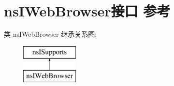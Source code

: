 \hypertarget{interfacens_i_web_browser}{}\section{ns\+I\+Web\+Browser接口 参考}
\label{interfacens_i_web_browser}
类 ns\+I\+Web\+Browser 继承关系图\+:\begin{figure}[H]
\begin{center}
\leavevmode
\includegraphics[height=2.000000cm]{interfacens_i_web_browser}
\end{center}
\end{figure}
